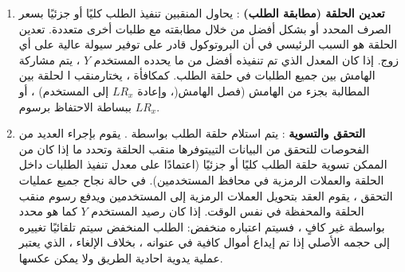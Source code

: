 \documentclass[12pt, a4paper, leqno]{report}
\makeatletter
\newenvironment{figurehere}
 {\def\@captype{figure}}
 {}
\theoremstyle{plain}
\theoremstyle{definition}
\makeatother
\begin{document}
\begin{multicols}{2}
\begin{otherlanguage}{arabic}
\begin{enumerate}
\begin{center}
\begin{figurehere}

\caption{عملية تبادل $loopring$}
\label{fig:process}
\end{figurehere}
\end{center}
  
  \item \textbf{تعدين الحلقة (مطابقة الطلب)} : يحاول المنقبين تنفيذ الطلب كليًا أو جزئيًا بسعر الصرف المحدد أو بشكل أفضل من خلال مطابقته مع طلبات أخرى متعددة.  تعدين الحلقة هو السبب الرئيسي في أن البروتوكول قادر على توفير سيولة عالية على أي زوج.  إذا كان المعدل الذي تم تنفيذه أفضل من ما يحدده المستخدم $Y$ ، يتم مشاركة الهامش بين جميع الطلبات في حلقة الطلب. كمكافأة ، يختارمنقب ا لحلقة  بين المطالبة بجزء من الهامش (فصل الهامش(، وإعادة $LR_x$  إلى المستخدم) ، أو ببساطة الاحتفاظ برسوم $LR_x$.

  \item \textbf{التحقق والتسوية} : يتم استلام حلقة الطلب بواسطة  . يقوم بإجراء العديد من الفحوصات للتحقق من البيانات التييتوفرها منقب الحلقة وتحدد ما إذا كان من الممكن تسوية حلقة الطلب كليًا أو جزئيًا (اعتمادًا على معدل تنفيذ الطلبات داخل الحلقة والعملات الرمزية في محافظ المستخدمين). في حالة نجاح جميع عمليات التحقق ، يقوم العقد بتحويل العملات الرمزية إلى المستخدمين ويدفع رسوم منقب الحلقة والمحفظة في نفس الوقت. إذا كان رصيد المستخدم $Y$ كما هو محدد بواسطة  غير كافٍ ، فسيتم اعتباره منخفض:  الطلب المنخفض سيتم تلقائيًا تغييره إلى حجمه الأصلي إذا تم إيداع أموال كافية في عنوانه ، بخلاف الإلغاء ، الذي يعتبر عملية يدوية احادية الطريق ولا يمكن عكسها.

\end{enumerate}
\end{otherlanguage}
\end{multicols}
\end{document}
